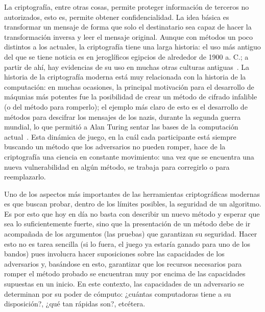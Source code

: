 La criptografía, entre otras cosas, permite proteger información de
terceros no autorizados, esto es, permite obtener confidencialidad. La idea
básica es transformar un mensaje de forma que solo el destinatario sea capaz
de hacer la transformación inversa y leer el mensaje original. Aunque con
métodos un poco distintos a los actuales, la criptografía tiene una larga
historia: el uso más antiguo del que se tiene noticia es en jeroglíficos
egipcios de alrededor de 1900 a. C.; a partir de ahí, hay evidencias de su uso
en muchas otras culturas antiguas~\cite{codebreakers}. La historia de la
criptografía moderna está muy relacionada con la historia de la computación: en
muchas ocasiones, la principal motivación para el desarrollo de máqunias más
potentes fue la posibilidad de crear un método de cifrado infalible (o del
método para romperlo); el ejemplo más claro de esto es el desarrollo de
métodos para descifrar los mensajes de los nazis, durante la segunda guerra
mundial, lo que permitió a Alan Turing sentar las bases de la computación
actual~\cite{simon_singht}. Esta dinámica de juego, en la cuál cada participante
está siempre buscando un método que los adversarios no pueden romper,
hace de la criptografía una ciencia en constante movimiento: una vez que
se encuentra una nueva vulnerabilidad en algún método, se trabaja para
corregirlo o para reemplazarlo.

Uno de los aspectos más importantes de las herramientas criptográficas
modernas es que buscan probar, dentro de los límites posibles, la
seguridad de un algoritmo. Es por esto que hoy en día no basta con
describir un nuevo método y esperar que sea lo suficientemente fuerte,
sino que la presentación de un método debe de ir acompañada de los
argumentos (las pruebas) que garantizan su seguridad. Hacer esto no es
tarea sencilla (si lo fuera, el juego ya estaría ganado para uno de los
bandos) pues involucra hacer suposiciones sobre las capacidades de
los adversarios y, basándose en esto, garantizar que los recursos necesarios
para romper el método probado se encuentran muy por encima de las capacidades
supuestas en un inicio. En este contexto, las capacidades de un adversario
se determinan por su poder de cómputo: ¿cuántas computadoras tiene a su
disposición?, ¿qué tan rápidas son?, etcétera.


